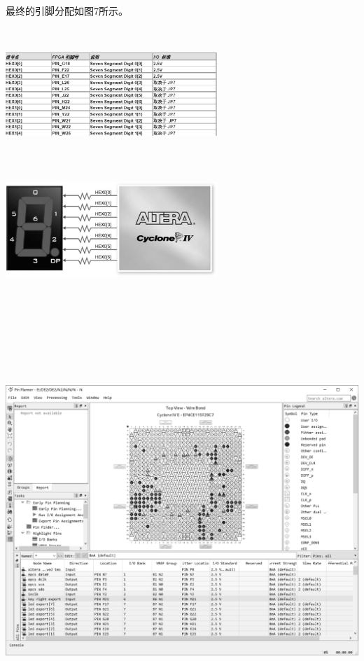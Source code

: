 \documentclass[UTF8]{ctexart}
\makeatletter
\newcommand{\figcaption}{\def\@captype{figure}\caption}
\makeatother
\begin{document}
最终的引脚分配如图7所示。
\begin{center}
	\includegraphics[width=8cm,height=5cm]{segpin.eps}
	\includegraphics[width=8cm,height=5cm]{seglianjie.eps}
	\figcaption{(1)数码管管脚分配(截取部分)；(2)数码管与FPGA连接}\label{segs.eps}
\end{center}
\begin{center}
		\includegraphics[width=16cm,height=16cm]{pinplaner.eps}
		\figcaption{最终的引脚分配}
\end{center}
\end{document}
